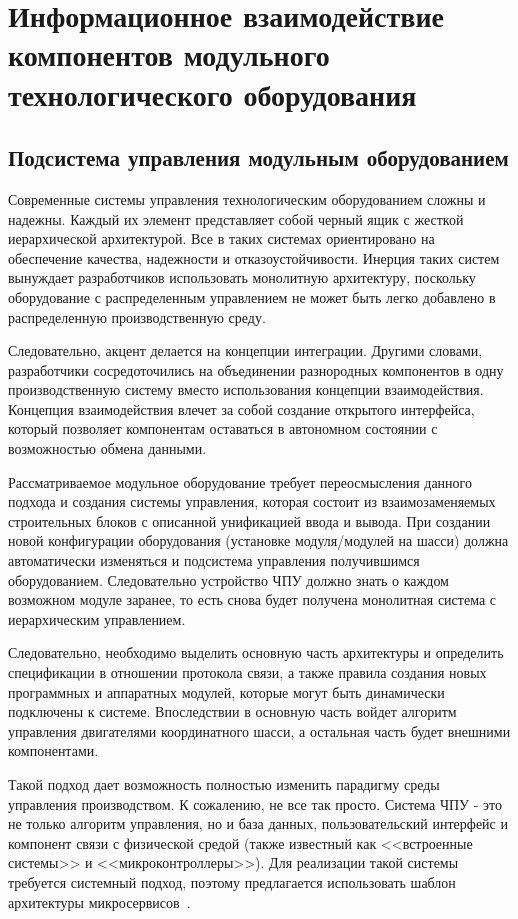 \chapter{Информационное взаимодействие компонентов модульного технологического оборудования}\label{ch:ch3}

\section{Подсистема управления модульным оборудованием}\label{sec:ch3/sec1}

Современные системы управления технологическим оборудованием сложны и надежны. Каждый их элемент представляет собой черный ящик с жесткой иерархической архитектурой. Все в таких системах ориентировано на обеспечение качества, надежности и отказоустойчивости. Инерция таких систем вынуждает разработчиков использовать монолитную архитектуру, поскольку оборудование с распределенным управлением не может быть легко добавлено в распределенную производственную среду.

Следовательно, акцент делается на концепции интеграции. Другими словами, разработчики сосредоточились на объединении разнородных компонентов в одну производственную систему вместо использования концепции взаимодействия. Концепция взаимодействия влечет за собой создание открытого интерфейса, который позволяет компонентам оставаться в автономном состоянии с возможностью обмена данными.

Рассматриваемое модульное оборудование требует переосмысления данного подхода и создания системы управления, которая состоит из взаимозаменяемых строительных блоков с описанной унификацией ввода и вывода. При создании новой конфигурации оборудования (установке модуля/модулей на шасси) должна автоматически изменяться и подсистема управления получившимся оборудованием. Следовательно устройство ЧПУ должно знать о каждом возможном модуле заранее, то есть снова будет получена монолитная система с иерархическим управлением.

Следовательно, необходимо выделить основную часть архитектуры и определить спецификации в отношении протокола связи, а также правила создания новых программных и аппаратных модулей, которые могут быть динамически подключены к системе. Впоследствии в основную часть войдет алгоритм управления двигателями координатного шасси, а остальная часть будет внешними компонентами.

Такой подход дает возможность полностью изменить парадигму среды управления производством. К сожалению, не все так просто. Система ЧПУ - это не только алгоритм управления, но и база данных, пользовательский интерфейс и компонент связи с физической средой (также известный как <<встроенные системы>> и <<микроконтроллеры>>). Для реализации такой системы требуется системный подход, поэтому предлагается использовать шаблон архитектуры микросервисов~\cite{microservices2017indin}.

